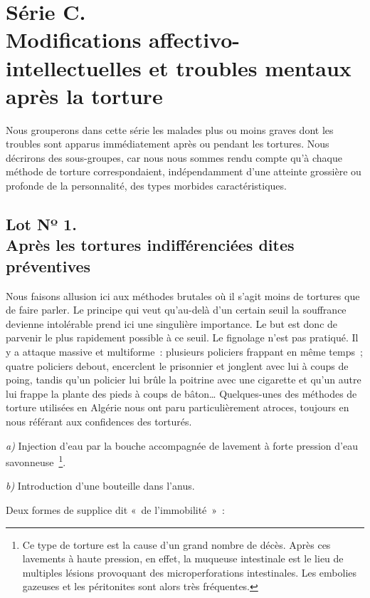 \documentclass[french,twoside]{book} %
\begin{document}
 \section[{Série C. Modifications affectivo-intellectuelles et troubles mentaux après la torture}]{Série C. \\
Modifications affectivo-intellectuelles et troubles mentaux après la torture}
\noindent Nous grouperons dans cette série les malades plus ou moins graves dont les troubles sont apparus immédiatement après ou pendant les tortures. Nous décrirons des sous-groupes, car nous nous sommes rendu compte qu’à chaque méthode de torture correspondaient, indépendamment d’une atteinte grossière ou profonde de la personnalité, des types morbides caractéristiques.\par
\bigbreak
\subsection[{Lot Nº 1. Après les tortures indifférenciées dites préventives}]{Lot Nº 1. \\
Après les tortures indifférenciées dites préventives}
\bigbreak
\noindent Nous faisons allusion ici aux méthodes brutales où il s’agit moins de tortures que de faire parler. Le principe qui veut qu’au-delà d’un certain seuil la souffrance devienne intolérable prend ici une singulière importance. Le but est donc de parvenir le plus rapidement possible à ce seuil. Le fignolage n’est pas pratiqué. Il y a attaque massive et multiforme : plusieurs policiers frappant en même temps ; quatre policiers debout, encerclent le prisonnier et jonglent avec lui à coups de poing, tandis qu’un policier lui brûle la poitrine avec une cigarette et qu’un autre lui frappe la plante des pieds à coups de bâton… Quelques-unes des méthodes de torture utilisées en Algérie nous ont paru particulièrement atroces, toujours en nous référant aux confidences des torturés.\par
 \bigbreak
\noindent \emph{a)} Injection d’eau par la bouche accompagnée de lavement à forte pression d’eau savonneuse \footnote{Ce type de torture est la cause d’un grand nombre de décès. Après ces lavements à haute pression, en effet, la muqueuse intestinale est le lieu de multiples lésions provoquant des microperforations intestinales. Les embolies gazeuses et les péritonites sont alors très fréquentes.}.\par
\emph{b)} Introduction d’une bouteille dans l’anus.\par
Deux formes de supplice dit « de l’immobilité » :\par
\end{document}
